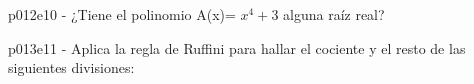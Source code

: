 \documentclass[spanish, 11pt]{exam}
\begin{document}
\begin{questions}
\begin{multicols}{3}
        \end{multicols}
        \question p012e10 - ¿Tiene el polinomio A(x)= $x^4 +3$ alguna raíz real?
        \begin{multicols}{1} 
        \end{multicols}
        \question p013e11 - Aplica la regla de Ruffini para hallar el cociente y el resto de las siguientes divisiones:
        \begin{multicols}{1} 

\end{multicols}
\end{questions}
\end{document}
